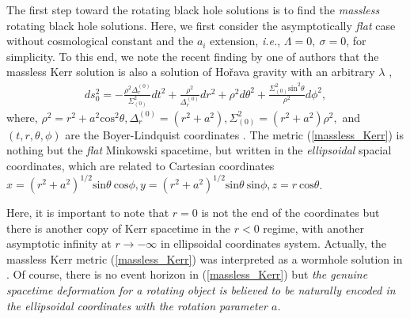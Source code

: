 \documentclass[preprint,aps,tightenlines,showkeys,nofootinbib,superscriptaddress]{revtex4}
\newcommand{\beq}{\begin{eqnarray}}
\newcommand{\eeq}{\end{eqnarray}}
\newcommand{\ci}{\cite}
\newcommand{\la}{{\lambda}}
\newcommand{\La}{{\Lambda}}
\newcommand{\si}{{\sigma}}
\newcommand{\no}{{\nonumber}}
\newcommand{\ra}{\rightarrow}
\begin{document}
The first step toward the rotating black hole solutions is to find the {\it massless} rotating black hole solutions. Here, we first consider the
asymptotically {\it flat} case without cosmological constant and the $a_i$
extension, {\it i.e.}, $\La=0,~ \si=0$, for simplicity. To this end, we note
the recent finding by one of authors that the massless Kerr solution is also
a solution of Ho\v{r}ava gravity with an arbitrary $\la$ \cite{Park:2023},
\beq
ds^2_{0}=-\frac{\rho^2 {\Delta}_r^{(0)} }{ {\Sigma}^2_{(0)}} dt^2+\frac{{\rho}^2}{ {\Delta}_r^{(0)}}dr^2+ {\rho}^2 d \theta^2
+\frac{{\Sigma}^2_{(0)} \mbox{sin}^2\theta}{{\rho}^2} d \phi ^2,
\label{massless_Kerr}
\eeq
where,
$
{\rho}^2 = r^2 + a^2 \mbox{cos}^2 \theta,
{\Delta}_r^{(0)} = \left( r^2 + a^2 \right) ,
{\Sigma}^2_{(0)} = \left( r^2 + a^2 \right) {\rho}^2,
$
and $(t,r,\theta, \phi)$ are the Boyer-Lindquist coordinates
\ci{Cart:1973,Gibb:1977,Park:2001}. The metric (\ref{massless_Kerr})
is nothing but the {\it flat} Minkowski spacetime, but written in the {\it ellipsoidal} spacial
coordinates, which are related to Cartesian coordinates
$x=(r^2+a^2)^{1/2} \mbox{sin}\theta~ \mbox{cos} \phi,
y=(r^2+a^2)^{1/2} \mbox{sin} \theta~ \mbox{sin} \phi,
z=r~\mbox{cos} \theta$.


Here, it is important to note that $r=0$
is not the end of the coordinates but there is another copy of Kerr spacetime
in the $r<0$ regime, with another asymptotic infinity at $r\ra -\infty$ in ellipsoidal coordinates system. Actually, the massless Kerr metric (\ref{massless_Kerr}) was interpreted as a wormhole solution in \cite{Gibb:2017}. Of course, there is no event horizon in (\ref{massless_Kerr}) but {\it the genuine spacetime deformation for a rotating object is believed to be naturally encoded in the ellipsoidal coordinates with the rotation parameter $a$.}
\end{document}
